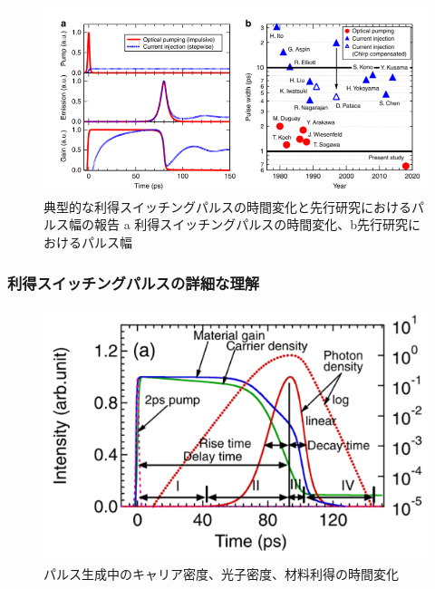 \begin{figure}[h]
	\centering
	\includegraphics[width=15cm]{figure/fig_1_1_GS_ito.png}
	\caption[典型的な利得スイッチングパルスの時間変化と先行研究におけるパルス幅]	{典型的な利得スイッチングパルスの時間変化と先行研究におけるパルス幅の報告
	\protect\newline a 利得スイッチングパルスの時間変化、b先行研究におけるパルス幅\cite{ref_t_ito}}
	\centering
	\label{fig:fig_1_1_GS_ito}
\end{figure}

\newpage
\subsubsection{利得スイッチングパルスの詳細な理解}
\begin{figure}[ht]
	\centering
	\includegraphics[width=15cm]{figure/fig_1_1_GS_pulse.png}
	\caption[パルス生成中のキャリア密度、光子密度、材料利得の時間変]{パルス生成中のキャリア密度、光子密度、材料利得の時間変化\cite{ref_1_1_GS}}
	\label{fig:fig_1_1_GS_pulse}
\end{figure}

